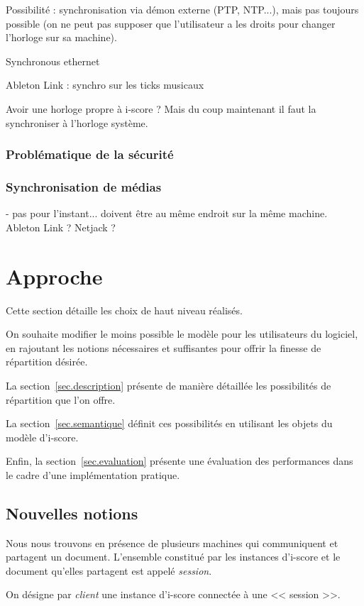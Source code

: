 \documentclass{article}
\newcommand\vocab[1]{\emph{#1}}
\begin{document}
Possibilité : synchronisation via démon externe (PTP, NTP...), mais pas toujours possible (on ne peut pas supposer que l'utilisateur a les droits pour changer l'horloge sur sa machine).

Synchronous ethernet

Ableton Link : synchro sur les ticks musicaux 

Avoir une horloge propre à i-score ? Mais du coup maintenant il faut la synchroniser à l'horloge système. 

\subsubsection{Problématique de la sécurité}

\subsubsection{Synchronisation de médias}
- pas pour l'instant... doivent être au même endroit sur la même machine.
Ableton Link ? Netjack ?

\section{Approche}
Cette section détaille les choix de haut niveau réalisés.

On souhaite modifier le moins possible le modèle pour les utilisateurs du logiciel, 
en rajoutant les notions nécessaires et suffisantes pour offrir la finesse de répartition désirée.

La section~\ref{sec.description} présente de manière détaillée les possibilités 
de répartition que l'on offre.

La section~\ref{sec.semantique} définit ces possibilités en utilisant les objets du modèle d'i-score.

Enfin, la section~\ref{sec.evaluation} présente une évaluation des performances dans le cadre 
d'une implémentation pratique.

\subsection{Nouvelles notions}
Nous nous trouvons en présence de plusieurs machines qui communiquent et partagent un document.
L'ensemble constitué par les instances d'i-score et le document qu'elles partagent est appelé \vocab{session}.

On désigne par \vocab{client} une instance d'i-score connectée à une << session >>.
\end{document}
